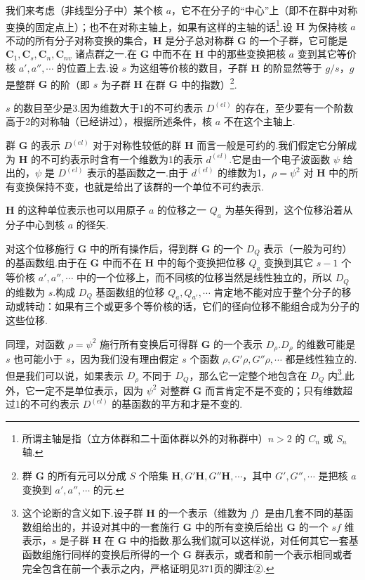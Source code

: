 \emergencystretch=0pt%


我们来考虑（非线型分子中）某个核 $a$，它不在分子的“中心”上（即不在群中对称变换的固定点上）；也不在对称主轴上，如果有这样的主轴的话\footnote{所谓主轴是指（立方体群和二十面体群以外的对称群中）$n>2$ 的 $C_n$ 或 $S_n$ 轴.}.设 $\boldsymbol{H}$ 为保持核 $a$ 不动的所有分子对称变换的集合，$\boldsymbol{H}$ 是分子总对称群 $\boldsymbol{G}$ 的一个子群，它可能是 $\boldsymbol{C}_1,\boldsymbol{C}_s,\boldsymbol{C}_n,\boldsymbol{C}_{nv}$ 诸点群之一.在 $\boldsymbol{G}$ 中而不在 $\boldsymbol{H}$ 中的那些变换把核 $a$ 变到其它等价核 $a',a'',\cdots$ 的位置上去.设 $s$ 为这组等价核的数目，子群 $\boldsymbol{H}$ 的阶显然等于 $g/s$，$g$ 是整群 $\boldsymbol{G}$ 的阶（即 $s$ 为子群 $\boldsymbol{H}$ 在群 $\boldsymbol{G}$ 中的指数）\footnote{群 $\boldsymbol{G}$ 的所有元可以分成 $S$ 个陪集 $\boldsymbol{H},G'\boldsymbol{H},G''\boldsymbol{H},\cdots$，其中 $G',G'',\cdots$ 是把核 $a$ 变换到 $a',a'',\cdots$ 的元.}.

$s$ 的数目至少是3.因为维数大于1的不可约表示 $D^{(el)}$ 的存在，至少要有一个阶数高于2的对称轴（已经讲过），根据所述条件，核 $a$ 不在这个主轴上.

群 $\boldsymbol{G}$ 的表示 $D^{(el)}$ 对于对称性较低的群 $\boldsymbol{H}$ 而言一般是可约的.我们假定它分解成为 $\boldsymbol{H}$ 的不可约表示时含有一个维数为1的表示 $d^{(el)}$.它是由一个电子波函数 $\psi$ 给出的，$\psi$ 是 $D^{(el)}$ 表示的基函数之一.由于 $d^{(el)}$ 的维数为1，$\rho=\psi^2$ 对 $\boldsymbol{H}$ 中的所有变换保持不变，也就是给出了该群的一个单位不可约表示.

$\boldsymbol{H}$ 的这种单位表示也可以用原子 $a$ 的位移之一 $Q_a$ 为基矢得到，这个位移沿着从分子中心到核 $a$ 的径矢.

对这个位移施行 $\boldsymbol{G}$ 中的所有操作后，得到群 $\boldsymbol{G}$ 的一个 $D_Q$ 表示（一般为可约）的基函数组.由于在 $\boldsymbol{G}$ 中而不在 $\boldsymbol{H}$ 中的每个变换把位移 $Q_a$ 变换到其它 $s-1$ 个等价核 $a',a'',\cdots$ 中的一个位移上，而不同核的位移当然是线性独立的，所以 $D_Q$ 的维数为 $s$.构成 $D_Q$ 基函数组的位移 $Q_a,Q_{a'},\cdots$ 肯定地不能对应于整个分子的移动或转动：如果有三个或更多个等价核的话，它们的径向位移不能组合成为分子的这些位移.

同理，对函数 $\rho=\psi^2$ 施行所有变换后可得群 $\boldsymbol{G}$ 的一个表示 $D_\rho$.$D_\rho$ 的维数可能是 $s$ 也可能小于 $s$，因为我们没有理由假定 $s$ 个函数 $\rho,G'\rho,G''\rho,\cdots$ 都是线性独立的.但是我们可以说，如果表示 $D_\rho$ 不同于 $D_Q$，那么它一定整个地包含在 $D_Q$ 内\footnote{这个论断的含义如下.设子群 $\boldsymbol{H}$ 的一个表示（维数为 $f$）是由几套不同的基函数组给出的，并设对其中的一套施行 $\boldsymbol{G}$ 中的所有变换后给出 $\boldsymbol{G}$ 的一个 $sf$ 维表示，$s$ 是子群 $\boldsymbol{H}$ 在 $\boldsymbol{G}$ 中的指数.那么我们就可以这样说，对任何其它一套基函数组施行同样的变换后所得的一个 $\boldsymbol{G}$ 群表示，或者和前一个表示相同或者完全包含在前一个表示之内，严格证明见371页的脚注②.}.此外，它一定不是单位表示，因为 $\psi^2$ 对整群 $\boldsymbol{G}$ 而言肯定不是不变的；只有维数超过1的不可约表示 $D^{(el)}$ 的基函数的平方和才是不变的.

